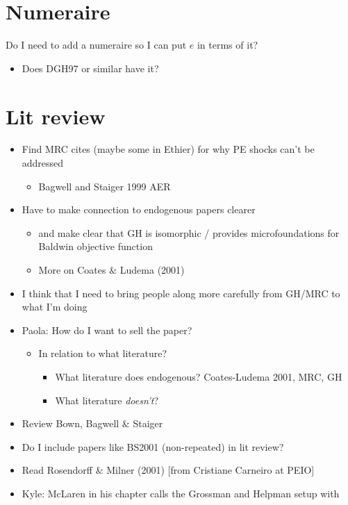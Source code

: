 \documentclass[12pt]{article}
\begin{document}
\section{Numeraire}
Do I need to add a numeraire so I can put $e$ in terms of it?
\begin{itemize}
	\item Does DGH97 or similar have it?
\end{itemize}


\section{Lit review}
\begin{itemize}
	\item Find MRC cites (maybe some in Ethier) for why PE shocks can't be addressed
		\begin{itemize}
			\item Bagwell and Staiger 1999 AER
		\end{itemize}
	\item Have to make connection to endogenous papers clearer
		\begin{itemize}
			\item and make clear that GH is isomorphic / provides microfoundations for Baldwin objective function
			\item More on Coates $\&$ Ludema (2001)
		\end{itemize}
	\item I think that I need to bring people along more carefully from GH/MRC to what I'm doing
	\item Paola: How do I want to sell the paper?
		\begin{itemize}
			\item In relation to what literature?
				\begin{itemize}
					\item What literature does endogenous? Coates-Ludema 2001, MRC, GH
					\item What literature \textit{doesn't}?
				\end{itemize}
			\end{itemize}
	\item Review Bown, Bagwell $\&$ Staiger
	\item Do I include papers like BS2001 (non-repeated) in lit review?
	\item Read Rosendorff $\&$ Milner (2001) [from Cristiane Carneiro at PEIO]
	\item Kyle: McLaren in his chapter calls the Grossman and Helpman setup with

\end{itemize}
\end{document}
